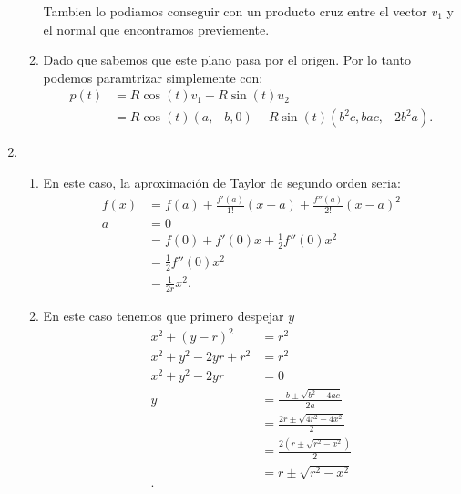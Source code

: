 \begin{enumerate}
\begin{enumerate}
	    Tambien lo podiamos conseguir con un producto cruz entre el vector $v_1$ y el normal que encontramos previemente.
	  \item Dado que sabemos que este plano pasa por el origen. Por lo tanto podemos paramtrizar simplemente con:
	    \begin{align*}
	      p\left( t \right) &= R\cos\left( t \right) v_1 + R\sin\left( t \right) u_2\\
	      &= R\cos\left( t \right) \left( a,-b,0 \right) + R\sin\left( t \right) \left( b^2c,bac,-2b^2a \right)
	    .\end{align*}
	\end{enumerate}
      \item 
	\begin{enumerate}
	  \item En este caso, la aproximación de Taylor de segundo orden seria:
	    \begin{align*}
	      f\left( x \right) &= f\left( a \right) + \frac{f'\left( a \right) }{1!}\left( x-a \right) + \frac{f''\left( a \right) }{2!}\left( x-a \right)^2\\
	      a &= 0 \\
	      &= f\left( 0 \right) + f'\left( 0 \right) x + \frac{1}{2}f''\left( 0 \right) x^2 \\
	      &= \frac{1}{2}f''\left( 0 \right) x^2 \\
	      &= \frac{1}{2r}x^2
	    .\end{align*}
	  \item En este caso tenemos que primero despejar $y$ 
	    \begin{align*}
	      x^2 + \left( y-r \right)^2 &= r^2 \\
	      x^2 + y^2 -2yr + r^2 &= r^2 \\
	      x^2 + y^2 - 2yr &= 0 \\
	      y &= \frac{-b \pm \sqrt{b^2-4ac} }{2a} \\
	      &= \frac{2r\pm\sqrt{4r^2-4x^2} }{2} \\
	      &= \frac{2\left( r\pm\sqrt{r^2-x^2}  \right) }{2} \\
	      &= r\pm\sqrt{r^2-x^2}  \\
	    .\end{align*}


\end{enumerate}
\end{enumerate}
